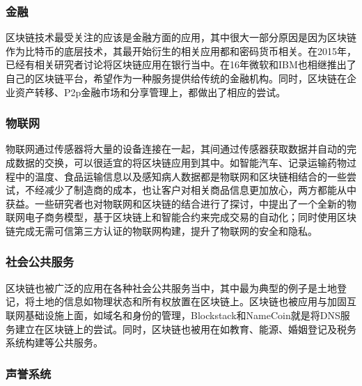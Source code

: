 
\subsubsection{金融}

区块链技术最受关注的应该是金融方面的应用，其中很大一部分原因是因为区块链作为比特币的底层技术，其最开始衍生的相关应用都和密码货币相关。在2015年，已经有相关研究者讨论将区块链应用在银行当中\supercite{peters2015trends}。在16年微软和IBM也相继推出了自己的区块链平台，希望作为一种服务提供给传统的金融机构。同时，区块链在企业资产转移、P2p金融市场和分享管理上，都做出了相应的尝试。

\subsubsection{物联网}

物联网通过传感器将大量的设备连接在一起，其间通过传感器获取数据并自动的完成数据的交换，可以很适宜的将区块链应用到其中。如智能汽车、记录运输药物过程中的温度\supercite{bocek2017blockchains}、食品运输信息\supercite{schneider2017design}以及感知病人数据都是物联网和区块链相结合的一些尝试，不经减少了制造商的成本，也让客户对相关商品信息更加放心，两方都能从中获益。一些研究者也对物联网和区块链的结合进行了探讨，\parencite{hardjono2016cloud}中提出了一个全新的物联网电子商务模型，基于区块链上和智能合约来完成交易的自动化；同时使用区块链完成无需可信第三方认证的物联网构建，提升了物联网的安全和隐私。


\subsubsection{社会公共服务}

区块链也被广泛的应用在各种社会公共服务当中，其中最为典型的例子是土地登记，将土地的信息如物理状态和所有权放置在区块链上\supercite{survey2015blockchain}。区块链也被应用与加固互联网基础设施上面，如域名和身份的管理，Blockstack\supercite{ali2016blockstack}和NameCoin\supercite{loibl2014namecoin}就是将DNS服务建立在区块链上的尝试。同时，区块链也被用在如教育、能源、婚姻登记及税务系统构建\supercite{akins2014whole}等公共服务。

\subsubsection{声誉系统}

